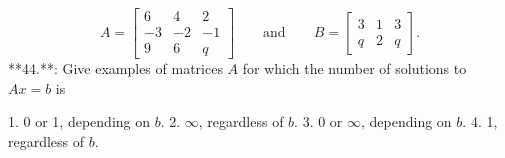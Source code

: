 \[A=\begin{bmatrix}6&4&2\\ -3&-2&-1\\ 9&6&q\end{bmatrix}\qquad\text{and}\qquad B=\begin{bmatrix}3&1&3\\ q&2&q\end{bmatrix}.\]
**44.**: Give examples of matrices \(A\) for which the number of solutions to \(Ax=b\) is

1. 0 or 1, depending on \(b\).
2. \(\infty\), regardless of \(b\).
3. 0 or \(\infty\), depending on \(b\).
4. 1, regardless of \(b\).


